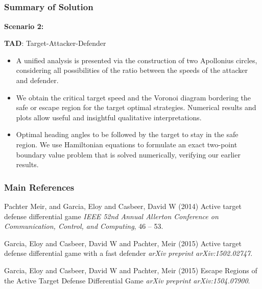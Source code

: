 \documentclass{beamer}
\begin{document}
\subsection{}
\begin{frame}
\frametitle{Summary of Solution}
\textbf{Scenario 2:}
\begin{exampleblock}{\textbf{TAD}: Target-Attacker-Defender}
	\begin{itemize}
		\item A unified analysis is presented via the construction of two Apollonius circles, considering all possibilities of the ratio between the speeds of the attacker and defender. 
		\item We obtain the critical target speed and the Voronoi diagram bordering the safe or escape region for the target optimal strategies. Numerical results and plots allow useful and insightful qualitative interpretations. 
		\item Optimal heading angles to be followed by the target to stay in the safe region. We use Hamiltonian equations to formulate an exact two-point boundary value problem that is solved numerically, verifying our earlier results.
	\end{itemize}
\end{exampleblock}
\end{frame}
\begin{frame}
\frametitle{Main References}
\footnotesize{
	\begin{thebibliography}{99} %
		 Pachter Meir, and Garcia, Eloy and Casbeer, David W (2014)
		\newblock Active target defense differential game
		\newblock \emph{IEEE 52nd Annual Allerton Conference on Communication, Control, and Computing}, 46 -- 53.
		
		Garcia, Eloy and Casbeer, David W and Pachter, Meir (2015)
		\newblock Active target defense differential game with a fast defender
		\newblock \emph{arXiv preprint arXiv:1502.02747}.
		
		Garcia, Eloy and Casbeer, David W and Pachter, Meir (2015)
		\newblock Escape Regions of the Active Target Defense Differential Game
		\newblock \emph{arXiv preprint arXiv:1504.07900}.
		
	\end{thebibliography}
}
\end{frame}
\end{document}

